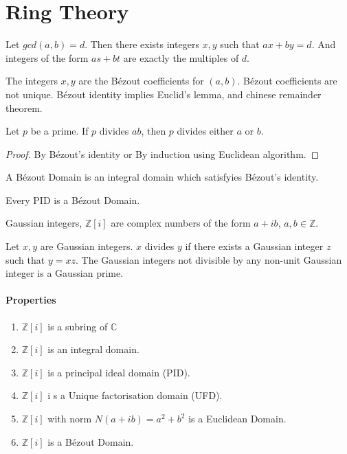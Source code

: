 \section{Ring Theory}
\begin{lemma}[B\'ezout]
	Let $gcd(a,b) = d$. Then there exists integers $x,y$ such that $ax+by = d$. And integers of the form $as+bt$ are exactly the multiples of $d$.
\end{lemma}

	The integers $x,y$ are the B\'ezout coefficients for $(a,b)$. B\'ezout coefficients are not unique.
	B\'ezout identity implies Euclid's lemma, and chinese remainder theorem.

\begin{lemma}[Euclid]
	Let $p$ be a prime. If $p$ divides $ab$, then $p$ divides either $a$ or $b$.
\end{lemma}
\begin{proof}
	By B\'ezout's identity or By induction using Euclidean algorithm.
\end{proof}

\begin{theorem}

\end{theorem}

\begin{definition}
	A B\'ezout Domain is an integral domain which satisfyies B\'ezout's identity.
\end{definition}
	Every PID is a B\'ezout Domain.

\begin{definition}
	Gaussian integers, $\mathbb{Z}[i]$ are complex numbers of the form $a+ib$, $a,b \in \mathbb{Z}$.
\end{definition}

	Let $x,y$ are Gaussian integers. $x$ divides $y$ if there exists a Gaussian integer $z$ such that $y = xz$.
	The Gaussian integers not divisible by any non-unit Gaussian integer is a Gaussian prime.
\paragraph{Properties}
	\begin{enumerate}
		\item $\mathbb{Z}[i]$ is a subring of $\mathbb{C}$
		\item $\mathbb{Z}[i]$ is an integral domain.
		\item $\mathbb{Z}[i]$ is a principal ideal domain (PID).
		\item $\mathbb{Z}[i]$ i s a Unique factorisation domain (UFD).
		\item $\mathbb{Z}[i]$ with norm $N(a+ib) = a^2+b^2$ is a Euclidean Domain.
		\item $\mathbb{Z}[i]$ is a B\'ezout Domain.
	\end{enumerate}

